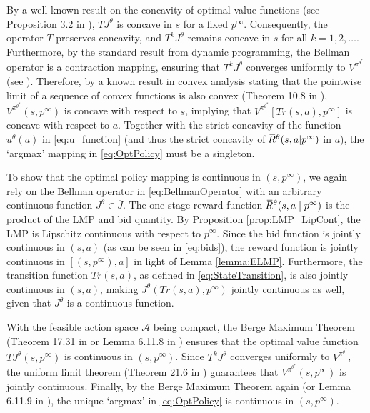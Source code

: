 \documentclass{article}
\theoremstyle{definition}
\theoremstyle{plain}
\newcommand{\overbar}[1]{\mkern1.5mu\overline{\mkern-3.0mu#1\mkern-1mu}\mkern 1.5mu}
\begin{document}
	By a well-known result on the concavity of optimal value functions (see Proposition 3.2 in \cite{fiacco1986convexity}), $TJ^{\theta}$ is concave in $s$ for a fixed $p^{\infty}$. Consequently, the operator $T$ preserves concavity, and $T^kJ^{\theta}$ remains concave in $s$ for all $k= 1, 2, \ldots .$
	Furthermore, by the standard result from dynamic programming, the Bellman operator is a contraction mapping, ensuring that $T^k J^{\theta}$ converges uniformly to $V^{\pi^{\theta^*}}$ (see \cite{bertsekas1996stochastic}). Therefore, by a known result in convex analysis stating that the pointwise limit of a sequence of convex functions is also convex (Theorem 10.8 in \cite{Rockafellar}), \( V^{\pi^{\theta^*}}(s, p^{\infty}) \) is concave with respect to \( s \), implying that $V^{\pi^{\theta^*}}[Tr(s,a), p^{\infty}]$ is concave with respect to $a$. Together with the strict concavity of the function $u^{\theta}(a)$ in \eqref{eq:u_function} (and thus the strict concavity of $\overbar{R}^{\theta}(s, a|p^{\infty})$ in $a$), the `argmax' mapping in \eqref{eq:OptPolicy} must be a singleton.
	
	To show that the optimal policy mapping is continuous in \( (s, p^{\infty}) \), we again rely on the Bellman operator in \eqref{eq:BellmanOperator} with an arbitrary continuous function \( J^{\theta} \in \overline{J} \). The one-stage reward function \( \overbar{R}^{\theta}(s, a \mid p^{\infty}) \) is the product of the LMP and bid quantity. By Proposition \ref{prop:LMP_LipCont}, the LMP is Lipschitz continuous with respect to \( p^{\infty} \). Since the bid function is jointly continuous in \( (s,a) \) (as can be seen in \eqref{eq:bids}), the reward function is jointly continuous in \( [(s, p^{\infty}), a] \) in light of Lemma \ref{lemma:ELMP}. Furthermore, the transition function \( Tr(s, a) \), as defined in \eqref{eq:StateTransition}, is also jointly continuous in \( (s, a) \), making \( J^{\theta}(Tr(s,a), p^{\infty}) \) jointly continuous as well, given that \( J^{\theta} \) is a continuous function.
	
	With the feasible action space \( \mathcal{A} \) being compact, the Berge Maximum Theorem (Theorem 17.31 in \cite{guide2006infinite} or Lemma 6.11.8 in \cite{Puterman_MDP}) ensures that the optimal value function \( TJ^{\theta}(s, p^{\infty}) \) is continuous in \( (s, p^{\infty}) \). Since \( T^k J^{\theta} \) converges uniformly to \( V^{\pi^{\theta^*}} \), the uniform limit theorem (Theorem 21.6 in \cite{Topology}) guarantees that \( V^{\pi^{\theta^*}}(s, p^{\infty}) \) is jointly continuous. Finally, by the Berge Maximum Theorem again (or Lemma 6.11.9 in \cite{Puterman_MDP}), the unique `argmax' in \eqref{eq:OptPolicy} is continuous in \( (s, p^{\infty}) \). %
\end{document}
